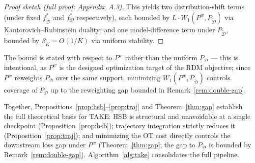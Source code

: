 \begin{foldable}
\begin{proof}[Proof sketch (full proof: Appendix~A.3)]
    This yields two distribution-shift terms (under fixed $f^*_{\tilde{\mathcal{D}}}$ and $f^*_\mathcal{D}$ respectively), each bounded by $L \cdot W_1(P^w, P_{\tilde{\mathcal{D}}})$ via Kantorovich--Rubinstein duality; and one model-difference term under $P_{\tilde{\mathcal{D}}}$, bounded by $\beta_K = O(1/K)$ via uniform stability.
  \end{proof}
  The bound is stated with respect to $P^w$ rather than the uniform $P_\mathcal{D}$ --- this is intentional, as $P^w$ is the designed optimization target of the RDM objective; since $P^w$ reweights $P_\mathcal{D}$ over the same support, minimizing $W_1(P^w, P_{\tilde{\mathcal{D}}})$ controls coverage of $P_\mathcal{D}$ up to the reweighting gap bounded in Remark~\ref{rem:double-gap}.
\end{foldable}

\begin{foldable} %
  Together, Propositions~\ref{prop:hsb}--\ref{prop:traj} and Theorem~\ref{thm:gap} establish the full theoretical basis for TAKE: HSB is structural and unavoidable at a single checkpoint (Proposition~\ref{prop:hsb}); trajectory integration strictly reduces it (Proposition~\ref{prop:traj}); and minimizing the OT cost directly controls the downstream loss gap under $P^w$ (Theorem~\ref{thm:gap}; the gap to $P_\mathcal{D}$ is bounded by Remark~\ref{rem:double-gap}).
  Algorithm~\ref{alg:take} consolidates the full pipeline.
\end{foldable}

